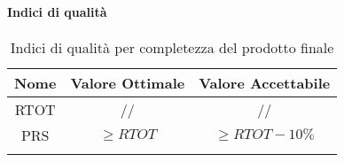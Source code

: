 		\paragraph{Indici di qualità}
			\begin{center}
				\begin{longtable}{|c|c|c|}
				\hline
				\rowcolor{lighter-grayer}
				\textbf{Nome} & \textbf{Valore Ottimale} & \textbf{Valore Accettabile}\\
				\hline
				\endfirsthead
				\hline
				RTOT & // &// \\
				\hline
				PRS & $\geq RTOT$ & $\geq RTOT - 10\%$ \\
				\hline
				\rowcolor{white}
				\caption{Indici di qualità per completezza del prodotto finale}
				\end{longtable}
			\end{center}
				
				
	
	
	
	
	
	
	
	
	
	
	
	
	
	
	
	